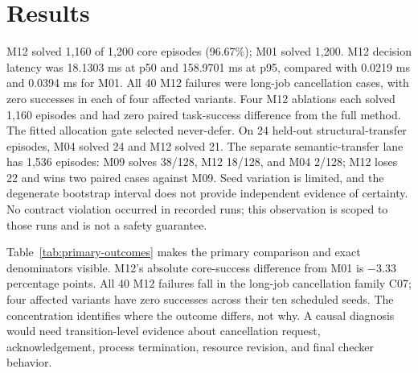 \documentclass[11pt]{article}
\begin{document}
\section{Results}
M12 solved 1,160 of 1,200 core episodes (96.67\%); M01 solved 1,200. M12 decision latency was 18.1303 ms at p50 and 158.9701 ms at p95, compared with 0.0219 ms and 0.0394 ms for M01. All 40 M12 failures were long-job cancellation cases, with zero successes in each of four affected variants. Four M12 ablations each solved 1,160 episodes and had zero paired task-success difference from the full method. The fitted allocation gate selected never-defer. On 24 held-out structural-transfer episodes, M04 solved 24 and M12 solved 21. The separate semantic-transfer lane has 1,536 episodes: M09 solves 38/128, M12 18/128, and M04 2/128; M12 loses 22 and wins two paired cases against M09. Seed variation is limited, and the degenerate bootstrap interval does not provide independent evidence of certainty. No contract violation occurred in recorded runs; this observation is scoped to those runs and is not a safety guarantee.

Table~\ref{tab:primary-outcomes} makes the primary comparison and exact denominators visible. M12's absolute core-success difference from M01 is $-3.33$ percentage points. All 40 M12 failures fall in the long-job cancellation family C07; four affected variants have zero successes across their ten scheduled seeds. The concentration identifies where the outcome differs, not why. A causal diagnosis would need transition-level evidence about cancellation request, acknowledgement, process termination, resource revision, and final checker behavior.
\end{document}

